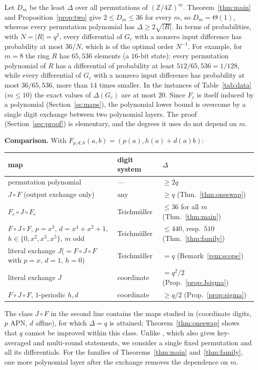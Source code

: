 \documentclass[11pt]{amsart}
\theoremstyle{definition}
\begin{document}
Let $D_m$ be the least $\Delta$ over all permutations of $(\mathbb Z/4\mathbb Z)^m$. Theorem~\ref{thm:main} and
Proposition~\ref{prop:two} give $2\le D_m\le36$ for every $m$, so $D_m=\Theta(1)$, whereas every permutation polynomial has
$\Delta\ge2\sqrt{|R|}$. In terms of probabilities, with $N=|R|=q^2$, every differential of $G_c$ with a nonzero input difference has probability at most
$36/N$, which is of the optimal order $N^{-1}$. For example, for $m=8$ the ring $R$ has $65{,}536$ elements (a $16$-bit state):
every permutation polynomial of $R$ has a differential of probability at least $512/65{,}536=1/128$, while every differential of $G_c$
with a nonzero input difference has probability at most $36/65{,}536$, more than $14$ times smaller.
In the instances of Table~\ref{tab:data} ($m\le10$) the exact values of $\Delta(G_c)$ are at most $20$. Since $F_c$ is itself
induced by a polynomial (Section~\ref{ss:maps}), the polynomial lower bound is overcome by a single digit exchange between two
polynomial layers. The proof (Section~\ref{sec:proof}) is elementary, and the degrees it uses do not depend on $m$.

\medskip
\noindent\textbf{Comparison.} With $F_{p,d,h}(a,b)=(p(a),h(a)+d(a)b)$:
\begin{center}
\begin{tabular}{p{}ll}
\toprule
map & digit system & $\Delta$\\
\midrule
permutation polynomial & --- & $\ge 2q$ \cite{RS}\\
$J\circ F$ (output exchange only) & any & $\ge q$ (Thm.~\ref{thm:oneswap})\\
$F_c\circ J\circ F_c$ & Teichm\"uller & $\le 36$ for all $m$ (Thm.~\ref{thm:main})\\
$F\circ J\circ F$, $p=x^3$, $d=x^4+x^2+1$,\newline $h\in\{0,x^2,x^3,x^5\}$, $m$ odd & Teichm\"uller & $\le 440$, resp.\ $510$ (Thm.~\ref{thm:family})\\
literal exchange $J$\newline ($=F\circ J\circ F$ with $p=x$, $d=1$, $h=0$) & Teichm\"uller & $=q$ (Remark~\ref{rem:scope})\\
literal exchange $J$ & coordinate & $=q^2/2$ (Prop.~\ref{prop:Jsigma})\\
$F\circ J\circ F$, $1$-periodic $h,d$ & coordinate & $\ge q/2$ (Prop.~\ref{prop:sigma})\\
\bottomrule
\end{tabular}
\end{center}
The class $J\circ F$ in the second line contains the maps studied in \cite{FukuiDE} (coordinate digits, $p$ APN, $d$ affine), for
which $\Delta=q$ is attained; Theorem~\ref{thm:oneswap} shows that $q$ cannot be improved within this class. Unlike \cite{FukuiDE}, which also gives key-averaged and multi-round
statements, we consider a single fixed permutation and all its differentials. For the families of Theorems~\ref{thm:main}
and~\ref{thm:family}, one more polynomial layer after the exchange removes the dependence on $m$.
\end{document}
